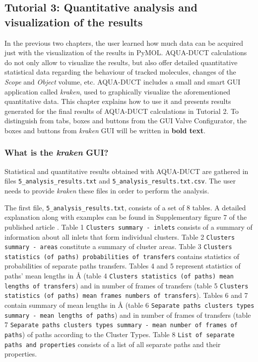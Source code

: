 \documentclass[9pt,tutorial, pubversion]{livecoms}
\begin{document}
\subsection{Tutorial 3: Quantitative analysis and visualization of the results}

In the previous two chapters, the user learned how much data can be acquired just with the visualization of the results in PyMOL. AQUA-DUCT calculations do not only allow to visualize the results, but also offer detailed  quantitative statistical data regarding the behaviour of tracked molecules, changes of the \textit{Scope} and \textit{Object} volume, etc. AQUA-DUCT includes a small and smart GUI application called \textit{kraken}, used to graphically visualize the aforementioned quantitative data. This chapter explains how to use it and presents results generated for the final results of AQUA-DUCT calculations in Tutorial 2. To distinguish from tabs, boxes and buttons from the GUI Valve Configurator, the boxes and buttons from \textit{kraken} GUI will be written in \textbf{bold text}.

\subsubsection{What is the \emph{kraken} GUI?}
Statistical and quantitative results obtained with AQUA-DUCT are gathered in files \texttt{5\_analysis\_results.txt} and \texttt{5\_analysis\_results.txt.csv}. The user needs to provide \textit{kraken} these files in order to perform the analysis.

The first file, \texttt{5\_analysis\_results.txt}, consists of a set of 8 tables. A detailed explanation along with examples can be found in Supplementary figure 7 of the published article \cite{Magdziarz2020}. 
Table 1 \texttt{Clusters summary - inlets} consists of a summary of information about all inlets that form individual clusters.
Table 2 \texttt{Clusters summary - areas} constitute a summary of cluster areas.
Table 3 \texttt{Clusters statistics (of paths) probabilities of transfers} contains statistics of probabilities of separate paths transfers. Tables 4 and 5 represent statistics of paths' mean lengths in Å (table 4 \texttt{Clusters statistics (of paths) mean lengths of transfers}) and in number of frames of transfers (table 5 \texttt{Clusters statistics (of paths) mean frames numbers of transfers}). Tables 6 and 7 contain summary of mean lengths in Å (table 6 \texttt{Separate paths clusters types summary - mean lengths of paths}) and in number of frames of transfers (table 7 \texttt{Separate paths clusters types summary - mean number of frames of paths}) of paths according to the Cluster Types. Table 8 \texttt{List of separate paths and properties} consists of a list of all separate paths and their properties. 
\end{document}
